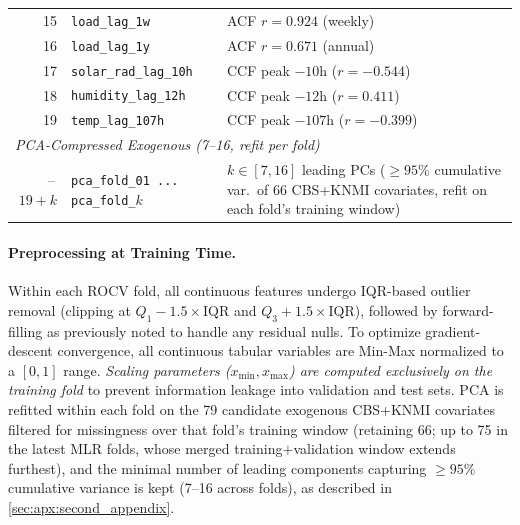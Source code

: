 \begin{table}[htbp]
\begin{tabularx}{\columnwidth}{r l X}
15 & \texttt{load\_lag\_1w}         & ACF $r = 0.924$ (weekly) \\
16 & \texttt{load\_lag\_1y}         & ACF $r = 0.671$ (annual) \\
17 & \texttt{solar\_rad\_lag\_10h}  & CCF peak $-10$h ($r = -0.544$) \\
18 & \texttt{humidity\_lag\_12h}    & CCF peak $-12$h ($r = 0.411$) \\
19 & \texttt{temp\_lag\_107h}       & CCF peak $-107$h ($r = -0.399$) \\
\midrule
\multicolumn{3}{l}{\textit{PCA-Compressed Exogenous (7--16, refit per fold)}} \\
\addlinespace[2pt]
20\,--\,$19{+}k$ & \texttt{pca\_fold\_01\,...\,pca\_fold\_$k$} & $k \in [7, 16]$ leading PCs (${\geq}95$\% cumulative var.\ of 66 CBS+KNMI covariates, refit on each fold's training window) \\
\bottomrule
\end{tabularx}
\end{table}


\paragraph{Preprocessing at Training Time.}
Within each ROCV fold, all continuous features undergo IQR-based outlier removal (clipping at $Q_1 - 1.5 \times \text{IQR}$ and $Q_3 + 1.5 \times \text{IQR}$), followed by forward-filling as previously noted to handle any residual nulls. To optimize gradient-descent convergence, all continuous tabular variables are Min-Max normalized to a $[0, 1]$ range. \textit{Scaling parameters ($x_{\min}, x_{\max}$) are computed exclusively on the training fold} to prevent information leakage into validation and test sets. PCA is refitted within each fold on the 79 candidate exogenous CBS+KNMI covariates filtered for missingness over that fold's training window (retaining 66; up to 75 in the latest MLR folds, whose merged training$+$validation window extends furthest), and the minimal number of leading components capturing $\geq 95\%$ cumulative variance is kept (7--16 across folds), as described in \ref{sec:apx:second_appendix}.
